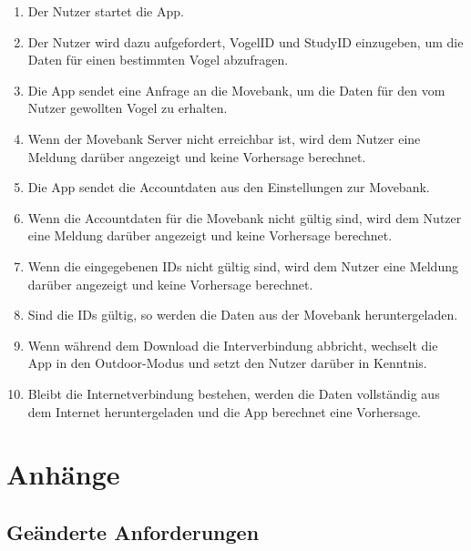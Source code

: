 \documentclass[12pt]{article} %
\begin{document}
\begin{enumerate}[label={\arabic*.}]
\item Der Nutzer startet die App.
\item Der Nutzer wird dazu aufgefordert, VogelID und StudyID einzugeben, um die Daten für einen bestimmten Vogel abzufragen.
\item Die App sendet eine Anfrage an die Movebank, um die Daten für den vom Nutzer gewollten Vogel zu erhalten.
\item Wenn der Movebank Server nicht erreichbar ist, wird dem Nutzer eine Meldung darüber angezeigt und keine Vorhersage berechnet.
\item Die App sendet die Accountdaten aus den Einstellungen zur Movebank.
\item Wenn die Accountdaten für die Movebank nicht gültig sind, wird dem Nutzer eine Meldung darüber angezeigt und keine Vorhersage berechnet.
\item Wenn die eingegebenen IDs nicht gültig sind, wird dem Nutzer eine Meldung darüber angezeigt und keine Vorhersage berechnet.
\item Sind die IDs gültig, so werden die Daten aus der Movebank heruntergeladen.
\item Wenn während dem Download die Interverbindung abbricht, wechselt die App in den Outdoor-Modus und setzt den Nutzer darüber in Kenntnis.
\item Bleibt die Internetverbindung bestehen, werden die Daten vollständig aus dem Internet heruntergeladen und die App berechnet eine Vorhersage.
\end{enumerate}




\section{Anhänge}

\subsection{Geänderte Anforderungen}


\end{document}
